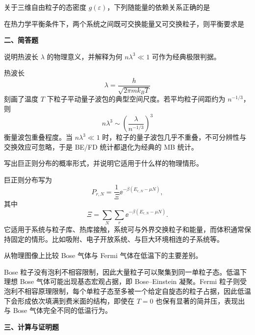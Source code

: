 \begin{question}
关于三维自由粒子的态密度 $g(\varepsilon)$，下列随能量的依赖关系正确的是
\begin{choiceoptions}[2]
\end{choiceoptions}

\begin{solution}
\end{solution}
\end{question}
\begin{question}
在热力学平衡条件下，两个系统之间既可交换能量又可交换粒子，则平衡要求是
\begin{choiceoptions}[2]
\end{choiceoptions}

\begin{solution}
\end{solution}
\end{question}
\textbf{二、简答题}

\begin{question}
说明热波长 $\lambda$ 的物理意义，并解释为何 $n\lambda^3\ll 1$ 可作为经典极限判据。

\begin{solution}
热波长
\[
\lambda=\frac{h}{\sqrt{2\pi m k_B T}}
\]
刻画了温度 $T$ 下粒子平动量子波包的典型空间尺度。若平均粒子间距约为 $n^{-1/3}$，则
\[
n\lambda^3 \sim \left(\frac{\lambda}{n^{-1/3}}\right)^3
\]
衡量波包重叠程度。当 $n\lambda^3\ll 1$ 时，粒子的量子波包几乎不重叠，不可分辨性与交换效应可忽略，于是 BE/FD 统计都退化为经典的 MB 统计。
\end{solution}
\end{question}
\begin{question}
写出巨正则分布的概率形式，并说明它适用于什么样的物理情形。

\begin{solution}
巨正则分布写为
\[
P_{r,N}=\frac{1}{\Xi}\ee^{-\beta(E_{r,N}-\mu N)},
\]
其中
\[
\Xi=\sum_{N}\sum_r \ee^{-\beta(E_{r,N}-\mu N)}.
\]
它适用于系统与粒子库、热库接触，系统可与外界交换粒子和能量，而体积通常保持固定的情形。比如吸附、电子开放系统、与巨大环境相连的子系统等。
\end{solution}
\end{question}
\begin{question}
从物理图像上比较 Bose 气体与 Fermi 气体在低温下的主要差别。

\begin{solution}
Bose 粒子没有泡利不相容限制，因此大量粒子可以聚集到同一单粒子态。低温下理想 Bose 气体可能出现基态宏观占据，即 Bose--Einstein 凝聚。Fermi 粒子则受泡利不相容原理限制，每个单粒子态至多被一个给定自旋态的粒子占据，因此低温下会形成依次填满到费米面的结构，即使在 $T=0$ 也保有显著的简并压，表现出与 Bose 气体完全不同的低温行为。
\end{solution}
\end{question}
\textbf{三、计算与证明题}

